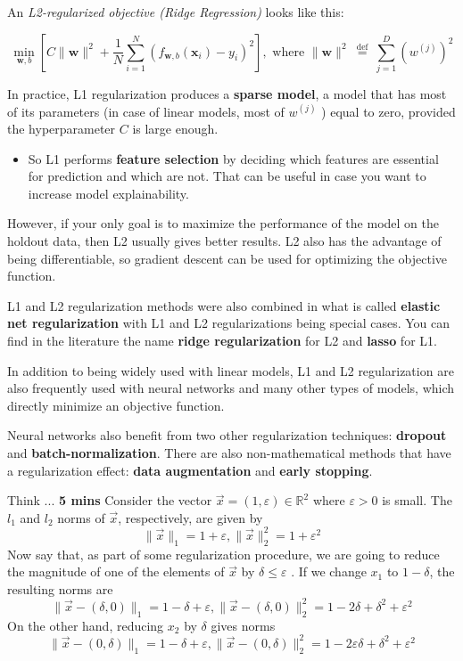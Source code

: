 \documentclass[8pt,dvipsnames]{beamer}
\begin{document}
\begin{frame}
	An \textit{L2-regularized objective (Ridge Regression)} looks like this:

	$$
		\min _{\mathbf{w}, b}\left[C\|\mathbf{w}\|^{2}+\frac{1}{N} \sum_{i=1}^{N}\left(f_{\mathbf{w}, b}\left(\mathbf{x}_{i}\right)-y_{i}\right)^{2}\right], \text { where }\|\mathbf{w}\|^{2} \stackrel{\text { def }}{=} \sum_{j=1}^{D}\left(w^{(j)}\right)^{2}
	$$

	In practice, L1 regularization produces a \textbf{sparse model}, a model that has most of its parameters (in case of linear models, most of $w^{(j)}$ ) equal to zero, provided the hyperparameter $C$ is large enough.
	\begin{itemize}
		\item So L1 performs \textbf{feature selection} by deciding which features are essential for prediction and which are not. That can be useful in case you want to increase model explainability.
	\end{itemize}
	However, if your only goal is to maximize the performance of the model on the holdout data, then L2 usually gives better results. L2 also has the advantage of being differentiable, so gradient descent can be used for optimizing the objective function.
\end{frame}

\begin{frame}
	L1 and L2 regularization methods were also combined in what is called \textbf{elastic net regularization} with L1 and L2 regularizations being special cases. You can find in the literature the name \textbf{ridge regularization }for L2 and \textbf{lasso} for L1.

	In addition to being widely used with linear models, L1 and L2 regularization are also frequently used with neural networks and many other types of models, which directly minimize an objective function.

	Neural networks also benefit from two other regularization techniques: \textbf{dropout} and \textbf{batch-normalization}. There are also non-mathematical methods that have a regularization effect: \textbf{data augmentation} and \textbf{early stopping}.
\end{frame}

\begin{frame}{Think ... \textbf{5 mins} }
	Consider the vector \(\vec{x}=(1, \varepsilon) \in \mathbb{R}^{2}\) where \(\varepsilon>0\) is small. The \(l_{1}\)
	and \(l_{2}\) norms of \(\vec{x}\), respectively, are given by
	$$
		\|\vec{x}\|_{1}=1+\varepsilon,\|\vec{x}\|_{2}^{2}=1+\varepsilon^{2}
	$$
	Now say that, as part of some regularization procedure, we are
	going to reduce the magnitude of one of the elements of \(\vec{x}\) by \(\delta \leq \varepsilon\)
	. If we change \(x_{1}\) to \(1-\delta\), the resulting norms are
	$$
		\|\vec{x}-(\delta, 0)\|_{1}=1-\delta+\varepsilon,\|\vec{x}-(\delta, 0)\|_{2}^{2}=1-2 \delta+\delta^{2}+\varepsilon^{2}
	$$
	On the other hand, reducing \(x_{2}\) by \(\delta\) gives norms
	$$
		\|\vec{x}-(0, \delta)\|_{1}=1-\delta+\varepsilon,\|\vec{x}-(0, \delta)\|_{2}^{2}=1-2 \varepsilon \delta+\delta^{2}	+\varepsilon^{2}
	$$
\end{frame}
\end{document}
